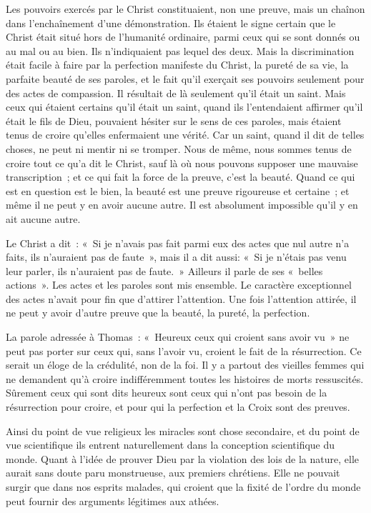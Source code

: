 \documentclass[french,twoside]{book} %
\begin{document}
Les pouvoirs exercés par le Christ constituaient, non une preuve, mais un chaînon dans l'enchaînement d'une démonstration. Ils étaient le signe certain que le Christ était situé hors de l'humanité ordinaire, parmi ceux qui se sont donnés ou au mal ou au bien. Ils n'indiquaient pas lequel des deux. Mais la discrimination était facile à faire par la perfection manifeste du Christ, la pureté de sa vie, la parfaite beauté de ses paroles, et le fait qu'il exerçait ses pouvoirs seulement pour des actes de compassion. Il résultait de là seulement qu'il était un saint. Mais ceux qui étaient certains qu'il était un saint, quand ils l'entendaient affirmer qu'il était le fils de Dieu, pouvaient hésiter sur le sens de ces paroles, mais étaient tenus de croire qu'elles enfermaient une vérité. Car un saint, quand il dit de telles choses, ne peut ni mentir ni se tromper. Nous de même, nous sommes tenus de croire tout ce qu'a dit le Christ, sauf là où nous pouvons supposer une mauvaise transcription ; et ce qui fait la force de la preuve, c'est la beauté. Quand ce qui est en question est le bien, la beauté est une preuve rigoureuse et certaine ; et même il ne peut y en avoir aucune autre. Il est absolument impossible qu'il y en ait aucune autre.\par
Le Christ a dit : « Si je n'avais pas fait parmi eux des actes que nul autre n'a faits, ils n'auraient pas de faute », mais il a dit aussi: « Si je n'étais pas venu leur parler, ils n'auraient pas de faute. » Ailleurs il parle de ses « belles actions ». Les actes et les paroles sont mis ensemble. Le caractère exceptionnel des actes n'avait pour fin que d'attirer l'attention. Une fois l'attention attirée, il ne peut y avoir d'autre preuve que la beauté, la pureté, la perfection.\par
La parole adressée à Thomas : « Heureux ceux qui croient sans avoir vu » ne peut pas porter sur ceux qui, sans l'avoir vu, croient le fait de la résurrection. Ce serait un éloge de la crédulité, non de la foi. Il y a partout des vieilles femmes qui ne demandent qu'à croire indifféremment toutes les histoires de morts ressuscités. Sûrement ceux qui sont dits heureux sont ceux qui n'ont pas besoin de la résurrection pour croire, et pour qui la perfection et la Croix sont des preuves.\par
Ainsi du point de vue religieux les miracles sont chose secondaire, et du point de vue scientifique ils entrent naturellement dans la conception scientifique du monde. Quant à l'idée de prouver Dieu par la violation des lois de la nature, elle aurait sans doute paru monstrueuse, aux premiers chrétiens. Elle ne pouvait surgir que dans nos esprits malades, qui croient que la fixité de l'ordre du monde peut fournir des arguments légitimes aux athées.\par
\end{document}
